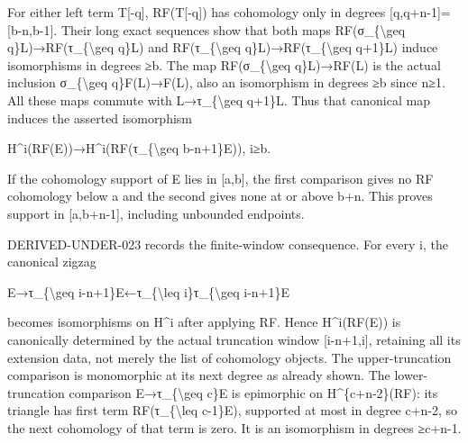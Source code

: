 For either left term T[-q]\allowbreak{},\allowbreak{} RF(T[-q]\allowbreak{})\allowbreak{} has cohomology only in degrees [q,\allowbreak{}q\allowbreak{}+n-1]\allowbreak{}\allowbreak{}=[b-n,\allowbreak{}b-1]\allowbreak{}. Their long exact sequences show that both maps RF(σ\_\allowbreak{}\{\textbackslash{}geq q\}L)\allowbreak{}\allowbreak{}→RF(τ\_\allowbreak{}\{\textbackslash{}geq q\}L)\allowbreak{} and RF(τ\_\allowbreak{}\{\textbackslash{}geq q\}L)\allowbreak{}\allowbreak{}→RF(τ\_\allowbreak{}\{\textbackslash{}geq q\allowbreak{}+1\}L)\allowbreak{} induce isomorphisms in degrees ≥b. The map RF(σ\_\allowbreak{}\{\textbackslash{}geq q\}L)\allowbreak{}\allowbreak{}→RF(L)\allowbreak{} is the actual inclusion σ\_\allowbreak{}\{\textbackslash{}geq q\}F(L)\allowbreak{}\allowbreak{}→F(L)\allowbreak{},\allowbreak{} also an isomorphism in degrees ≥b since n≥1. All these maps commute with L\allowbreak{}→τ\_\allowbreak{}\{\textbackslash{}geq q\allowbreak{}+1\}L. Thus that canonical map induces the asserted isomorphism

H\textasciicircum{}i(RF(E)\allowbreak{})\allowbreak{}\allowbreak{}→H\textasciicircum{}i(RF(τ\_\allowbreak{}\{\textbackslash{}geq b-n\allowbreak{}+1\}E)\allowbreak{})\allowbreak{},\allowbreak{} i≥b.

If the cohomology support of E lies in [a,\allowbreak{}b]\allowbreak{},\allowbreak{} the first comparison gives no RF cohomology below a and the second gives none at or above b\allowbreak{}+n. This proves support in [a,\allowbreak{}b\allowbreak{}+n-1]\allowbreak{},\allowbreak{} including unbounded endpoints.

DERIVED-UNDER-023 records the finite-window consequence. For every i,\allowbreak{} the canonical zigzag

E\allowbreak{}→τ\_\allowbreak{}\{\textbackslash{}geq i-n\allowbreak{}+1\}E←τ\_\allowbreak{}\{\textbackslash{}leq i\}τ\_\allowbreak{}\{\textbackslash{}geq i-n\allowbreak{}+1\}E

becomes isomorphisms on H\^{}i after applying RF. Hence H\textasciicircum{}i(RF(E)\allowbreak{})\allowbreak{} is canonically determined by the actual truncation window [i-n\allowbreak{}+1,\allowbreak{}i]\allowbreak{},\allowbreak{} retaining all its extension data,\allowbreak{} not merely the list of cohomology objects. The upper-truncation comparison is monomorphic at its next degree as already shown. The lower-truncation comparison E\allowbreak{}→τ\_\allowbreak{}\{\textbackslash{}geq c\}E is epimorphic on H\textasciicircum{}\{c\allowbreak{}+n-2\}(RF)\allowbreak{}:\allowbreak{} its triangle has first term RF(τ\_\allowbreak{}\{\textbackslash{}leq c-1\}E)\allowbreak{},\allowbreak{} supported at most in degree c\allowbreak{}+n-2,\allowbreak{} so the next cohomology of that term is zero. It is an isomorphism in degrees ≥c\allowbreak{}+n-1.

